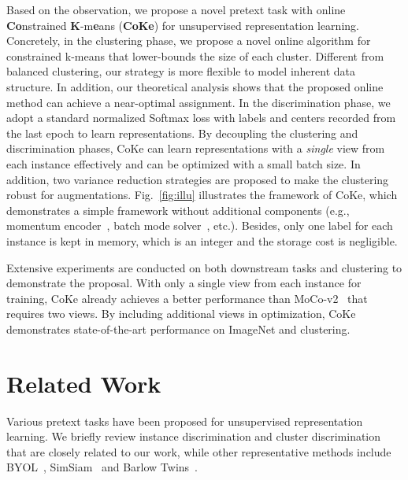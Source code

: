 \documentclass[10pt,twocolumn,letterpaper]{article}
\begin{document}
Based on the observation, we propose a novel pretext task with online \textbf{Co}nstrained \textbf{K}-m\textbf{e}ans (\textbf{CoKe}) for unsupervised representation learning. Concretely, in the clustering phase, we propose a novel online algorithm for constrained k-means that lower-bounds the size of each cluster. Different from balanced clustering, our strategy is more flexible to model inherent data structure. In addition, our theoretical analysis shows that the proposed online method can achieve a near-optimal assignment. In the discrimination phase, we adopt a standard normalized Softmax loss with labels and centers recorded from the last epoch to learn representations. By decoupling the clustering and discrimination phases, CoKe can learn representations with a \textit{single} view from each instance effectively and can be optimized with a small batch size. In addition, two variance reduction strategies are proposed to make the clustering robust for augmentations. Fig.~\ref{fig:illu} illustrates the framework of CoKe, which demonstrates a simple framework without additional components (e.g., momentum encoder~\cite{He0WXG20,GrillSATRBDPGAP20}, batch mode solver~\cite{CaronMMGBJ20,ZhanX0OL20}, etc.). Besides, only one label for each instance is kept in memory, which is an integer and the storage cost is negligible. 

Extensive experiments are conducted on both downstream tasks and clustering to demonstrate the proposal. With only a single view from each instance for training, CoKe already achieves a better performance than MoCo-v2~\cite{abs-2003-04297} that requires two views. By including additional views in optimization, CoKe demonstrates state-of-the-art performance on ImageNet and clustering.


\section{Related Work}\label{sec:related}
Various pretext tasks have been proposed for unsupervised representation learning. We briefly review instance discrimination and cluster discrimination that are closely related to our work, while other representative methods include BYOL~\cite{GrillSATRBDPGAP20}, SimSiam~\cite{ChenH21} and Barlow Twins~\cite{ZbontarJMLD21}.
\end{document}
